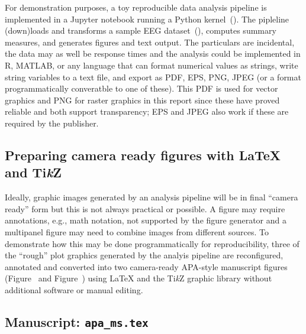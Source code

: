 \documentclass[helv,10pt,man,floatsintext]{apa6}  %
\begin{document}
For demonstration purposes, a toy reproducible data analysis pipeline
is implemented in a Jupyter notebook running a Python
kernel~(\cite{kluEtAl2016}).  The pipleline (down)loads and
transforms a sample EEG dataset~(\cite{Urbach2020z}), computes summary
measures, and generates figures and text output. The particulars are
incidental, the data may as well be response times and the analysis
could be implemented in R, MATLAB, or any language that can format
numerical values as strings, write string variables to a text file,
and export as PDF, EPS, PNG, JPEG (or a format programmatically
converatble to one of these). This PDF is used for vector graphics and
PNG for raster graphics in this report since these have proved
reliable and both support transparency; EPS and JPEG also work if
these are required by the publisher.


\subsection{Preparing camera ready figures with \LaTeX{} and Ti{\it k}Z}

Ideally, graphic images generated by an analysis pipeline will be in
final ``camera ready'' form but this is not always practical or
possible.  A figure may require annotations, e.g., math notation, not
supported by the figure generator and a multipanel figure may need to
combine images from different sources. To demonstrate how this may be
done programmatically for reproducibility, three of the ``rough'' plot
graphics generated by the analyis pipeline are reconfigured, annotated
and converted into two camera-ready APA-style manuscript figures
(Figure~ and Figure~) using \LaTeX{} and
the Ti{\it k}Z graphic library without additional software or manual
editing.


\subsection{Manuscript: \texttt{apa_ms.tex}}
\end{document}

